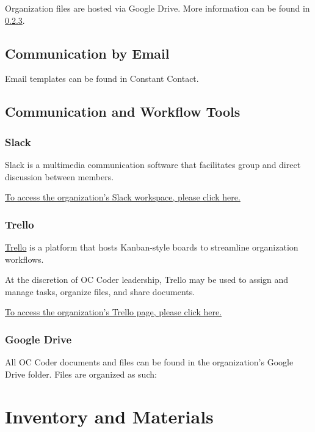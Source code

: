 \documentclass[twoside,11pt,letterpaper,abstracton]{scrartcl}
\begin{document}
Organization files are hosted via Google Drive. More information can be found in \ref{com-googledrive}.

\subsection{Communication by Email}

Email templates can be found in Constant Contact.

\subsection{Communication and Workflow Tools}

\subsubsection{Slack}

Slack is a multimedia communication software that facilitates group and direct discussion between members. 

\begin{resource}
    \href{}{To access the organization's Slack workspace, please click here.}
\end{resource}

\subsubsection{Trello}

\href{https://trello.com}{Trello} is a platform that hosts Kanban-style boards to streamline organization workflows. 

At the discretion of OC Coder leadership, Trello may be used to assign and manage tasks, organize files, and share documents. 

\begin{resource}
    \href{}{To access the organization's Trello page, please click here.}
\end{resource}

\subsubsection{Google Drive} \label{com-googledrive}

All OC Coder documents and files can be found in the organization's Google Drive folder. Files are organized as such:

\newpage

\section{Inventory and Materials}
\end{document}
